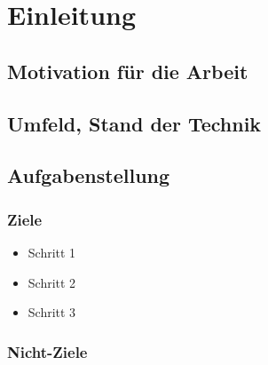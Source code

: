 \chapter{Einleitung}
	\section{Motivation für die Arbeit}
		\lipsum[1-1]
	\section{Umfeld, Stand der Technik}
		\lipsum[1-1]
	\section{Aufgabenstellung}
		\lipsum[1-1]

		\subsection{Ziele}
			\begin{itemize}
				\item Schritt 1
				\item Schritt 2
				\item Schritt 3
			\end{itemize}


		\subsection{Nicht-Ziele}
			\lipsum[1-1]